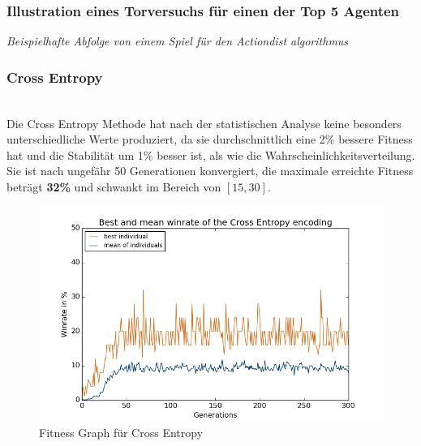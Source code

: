 \newpage
                \subsubsection*{Illustration eines Torversuchs für einen der Top 5 Agenten}
                \begin{center} \textit{Beispielhafte Abfolge von einem Spiel für den Actiondist algorithmus} \end{center}
\newpage
            \subsubsection*{Cross Entropy}
                \begin{multicols}{2}
                    \noindent
                    \\[5mm]
                    Die Cross Entropy Methode hat nach der statistischen Analyse keine besonders unterschiedliche Werte produziert, da sie durchschnittlich eine 2\% bessere Fitness hat und die Stabilität um 1\% besser ist, als wie die Wahrscheinlichkeitsverteilung.\\[2mm]
                    Sie ist nach ungefähr 50 Generationen konvergiert, die maximale erreichte Fitness beträgt \textbf{32\%} und schwankt im Bereich von $[15,30]$. 
                    \begin{figure}[H]
                       \includegraphics[scale=0.5]{../pictures/summary/cross-entropy-fitness.png}
                       \caption{Fitness Graph für Cross Entropy}\label{fig:graph-ce}
                    \end{figure}
                \end{multicols}


